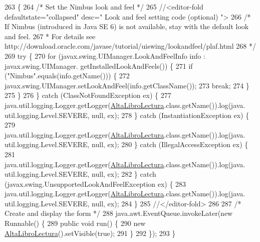 \begin{DoxyCode}
263                                            \{
264         \textcolor{comment}{/* Set the Nimbus look and feel */}
265         \textcolor{comment}{//<editor-fold defaultstate="collapsed" desc=" Look and feel setting code (optional) ">}
266         \textcolor{comment}{/* If Nimbus (introduced in Java SE 6) is not available, stay with the default look and feel.}
267 \textcolor{comment}{         * For details see http://download.oracle.com/javase/tutorial/uiswing/lookandfeel/plaf.html }
268 \textcolor{comment}{         */}
269         \textcolor{keywordflow}{try} \{
270             \textcolor{keywordflow}{for} (javax.swing.UIManager.LookAndFeelInfo info : javax.swing.UIManager.
      getInstalledLookAndFeels()) \{
271                 \textcolor{keywordflow}{if} (\textcolor{stringliteral}{"Nimbus"}.equals(info.getName())) \{
272                     javax.swing.UIManager.setLookAndFeel(info.getClassName());
273                     \textcolor{keywordflow}{break};
274                 \}
275             \}
276         \} \textcolor{keywordflow}{catch} (ClassNotFoundException ex) \{
277             java.util.logging.Logger.getLogger(\mbox{\hyperlink{class_interfaz_package_1_1_alta_libro_lectura_ad5a9ed62b2923309a5aebfa87cebc4b2}{AltaLibroLectura}}.class.getName()).log(java.
      util.logging.Level.SEVERE, null, ex);
278         \} \textcolor{keywordflow}{catch} (InstantiationException ex) \{
279             java.util.logging.Logger.getLogger(\mbox{\hyperlink{class_interfaz_package_1_1_alta_libro_lectura_ad5a9ed62b2923309a5aebfa87cebc4b2}{AltaLibroLectura}}.class.getName()).log(java.
      util.logging.Level.SEVERE, null, ex);
280         \} \textcolor{keywordflow}{catch} (IllegalAccessException ex) \{
281             java.util.logging.Logger.getLogger(\mbox{\hyperlink{class_interfaz_package_1_1_alta_libro_lectura_ad5a9ed62b2923309a5aebfa87cebc4b2}{AltaLibroLectura}}.class.getName()).log(java.
      util.logging.Level.SEVERE, null, ex);
282         \} \textcolor{keywordflow}{catch} (javax.swing.UnsupportedLookAndFeelException ex) \{
283             java.util.logging.Logger.getLogger(\mbox{\hyperlink{class_interfaz_package_1_1_alta_libro_lectura_ad5a9ed62b2923309a5aebfa87cebc4b2}{AltaLibroLectura}}.class.getName()).log(java.
      util.logging.Level.SEVERE, null, ex);
284         \}
285         \textcolor{comment}{//</editor-fold>}
286 
287         \textcolor{comment}{/* Create and display the form */}
288         java.awt.EventQueue.invokeLater(\textcolor{keyword}{new} Runnable() \{
289             \textcolor{keyword}{public} \textcolor{keywordtype}{void} run() \{
290                 \textcolor{keyword}{new} \mbox{\hyperlink{class_interfaz_package_1_1_alta_libro_lectura_ad5a9ed62b2923309a5aebfa87cebc4b2}{AltaLibroLectura}}().setVisible(\textcolor{keyword}{true});
291             \}
292         \});
293     \}
\end{DoxyCode}


